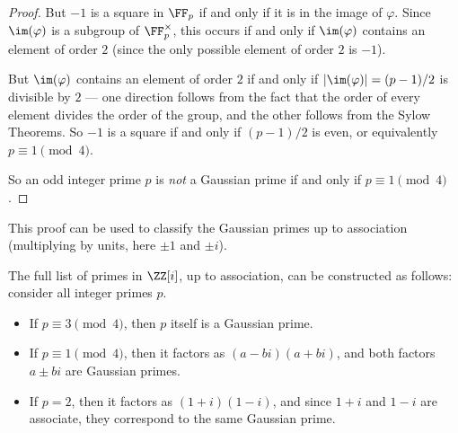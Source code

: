 \begin{proof}
But $-1$ is a square in $\FF_p$ if and only if it is in the image of $\varphi$. Since $\im(\varphi)$ is a subgroup of $\FF_p^\times$, this occurs if and only if $\im(\varphi)$ contains an element of order $2$ (since the only possible element of order $2$ is $-1$). 

But $\im(\varphi)$ contains an element of order $2$ if and only if $\lvert \im(\varphi)\rvert = (p - 1)/2$ is divisible by $2$ --- one direction follows from the fact that the order of every element divides the order of the group, and the other follows from the Sylow Theorems. So $-1$ is a square if and only if $(p - 1)/2$ is even, or equivalently $p \equiv 1 \pmod{4}$. 

So an odd integer prime $p$ is \emph{not} a Gaussian prime if and only if $p \equiv 1 \pmod{4}$. 
\end{proof}

This proof can be used to classify the Gaussian primes up to association (multiplying by units, here $\pm 1$ and $\pm i$).

\begin{theorem}
The full list of primes in $\ZZ[i]$, up to association, can be constructed as follows: consider all integer primes $p$. 
\begin{itemize}
    \item If $p \equiv 3 \pmod{4}$, then $p$ itself is a Gaussian prime. 
    \item If $p \equiv 1 \pmod{4}$, then it factors as $(a - bi)(a + bi)$, and both factors $a \pm bi$ are Gaussian primes. 
    \item If $p = 2$, then it factors as $(1 + i)(1 - i)$, and since $1 + i$ and $1 - i$ are associate, they correspond to the same Gaussian prime.
\end{itemize}
\end{theorem}

